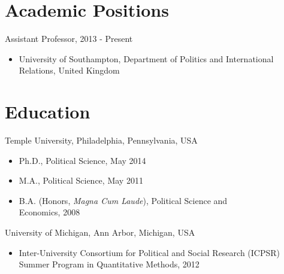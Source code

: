 \documentclass[margin, 12pt]{res} %
\begin{document}
\begin{resume}



\section{Academic Positions}
Assistant Professor, 2013 - Present
\begin{itemize}
\item University of Southampton, Department of Politics and International Relations, United Kingdom
\end{itemize}



\section{Education}
Temple University, Philadelphia, Pennsylvania, USA
\begin{itemize}
\item Ph.D., Political Science, May 2014
\item M.A., Political Science, May 2011
\item B.A. (Honors, \emph{Magna Cum Laude}), Political Science and \\
Economics, 2008
\end{itemize}

University of Michigan, Ann Arbor, Michigan, USA
\begin{itemize}
\item Inter-University Consortium for Political and Social Research (ICPSR) Summer Program in Quantitative Methods,
 2012
 \end{itemize}


\end{resume}
\end{document}
